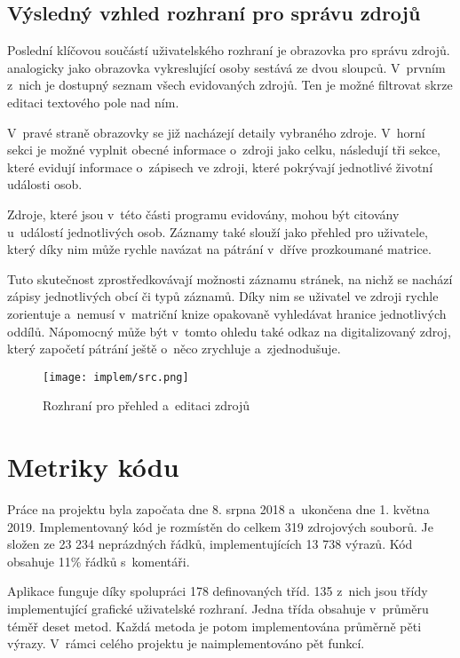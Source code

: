 		\subsection*{Výsledný vzhled rozhraní pro správu zdrojů}
		Poslední klíčovou součástí uživatelského rozhraní je obrazovka pro správu zdrojů. analogicky jako obrazovka vykreslující osoby sestává ze dvou sloupců. V~prvním z~nich je dostupný seznam všech evidovaných zdrojů. Ten je možné filtrovat skrze editaci textového pole nad ním.\par
		V~pravé straně obrazovky se již nacházejí detaily vybraného zdroje. V~horní sekci je možné vyplnit obecné informace o~zdroji jako celku, následují tři sekce, které evidují informace o~zápisech ve zdroji, které pokrývají jednotlivé životní události osob.\par
		Zdroje, které jsou v~této části programu evidovány, mohou být citovány u~událostí jednotlivých osob. Záznamy také slouží jako přehled pro uživatele, který díky nim může rychle navázat na pátrání v~dříve prozkoumané matrice. \par
		Tuto skutečnost zprostředkovávají možnosti záznamu stránek, na nichž se nachází zápisy jednotlivých obcí či typů záznamů. Díky nim se uživatel ve zdroji rychle zorientuje a~nemusí v~matriční knize opakovaně vyhledávat hranice jednotlivých oddílů. Nápomocný může být v~tomto ohledu také odkaz na digitalizovaný zdroj, který započetí pátrání ještě o~něco zrychluje a~zjednodušuje. \par
		\begin{figure}[H]
			\centering
			\texttt{[image: implem/src.png]}
			\caption{Rozhraní pro přehled a~editaci zdrojů}
			\label{fig:implemSrc}
		\end{figure}

	
	\section{Metriky kódu}
	Práce na projektu byla započata dne 8. srpna 2018 a~ukončena dne 1. května 2019. Implementovaný kód je rozmístěn do celkem 319 zdrojových souborů. Je složen ze 23 234 neprázdných řádků, implementujících 13 738 výrazů. Kód obsahuje 11\% řádků s~komentáři.\par
	Aplikace funguje díky spolupráci 178 definovaných tříd. 135 z~nich jsou třídy implementující grafické uživatelské rozhraní. Jedna třída obsahuje v~průměru téměř deset metod. Každá metoda je potom implementována průměrně pěti výrazy. V~rámci celého projektu je naimplementováno pět funkcí. \par
	

